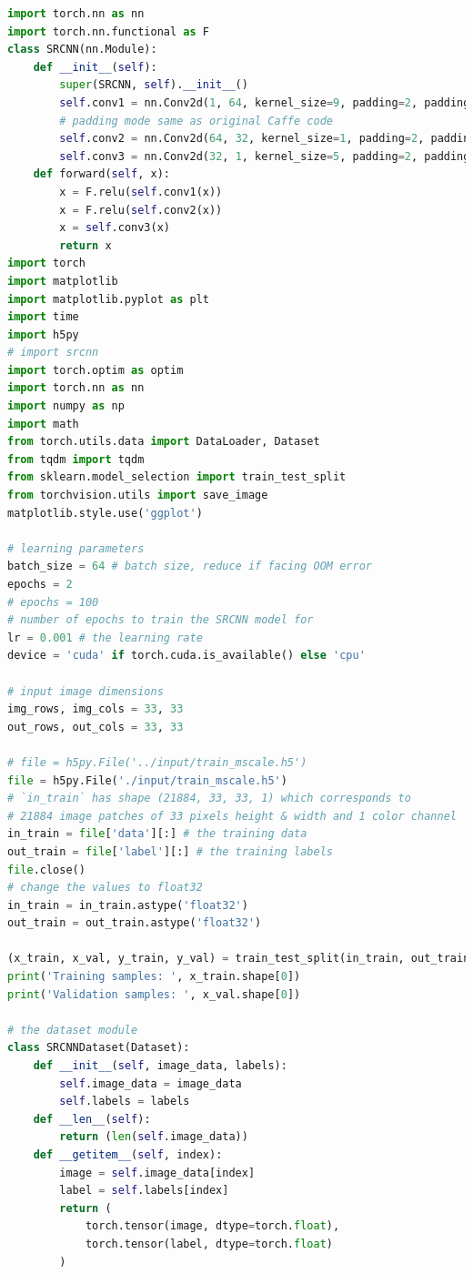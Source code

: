 \documentclass[11pt,UTF8]{ctexart}
\begin{document}
	\begin{lstlisting}[language={python}]
import torch.nn as nn
import torch.nn.functional as F
class SRCNN(nn.Module):
    def __init__(self):
        super(SRCNN, self).__init__()
        self.conv1 = nn.Conv2d(1, 64, kernel_size=9, padding=2, padding_mode='replicate') 
        # padding mode same as original Caffe code
        self.conv2 = nn.Conv2d(64, 32, kernel_size=1, padding=2, padding_mode='replicate')
        self.conv3 = nn.Conv2d(32, 1, kernel_size=5, padding=2, padding_mode='replicate')
    def forward(self, x):
        x = F.relu(self.conv1(x))
        x = F.relu(self.conv2(x))
        x = self.conv3(x)
        return x
import torch
import matplotlib
import matplotlib.pyplot as plt
import time
import h5py
# import srcnn
import torch.optim as optim
import torch.nn as nn
import numpy as np
import math
from torch.utils.data import DataLoader, Dataset
from tqdm import tqdm
from sklearn.model_selection import train_test_split
from torchvision.utils import save_image
matplotlib.style.use('ggplot')

# learning parameters
batch_size = 64 # batch size, reduce if facing OOM error
epochs = 2
# epochs = 100
# number of epochs to train the SRCNN model for
lr = 0.001 # the learning rate
device = 'cuda' if torch.cuda.is_available() else 'cpu'

# input image dimensions
img_rows, img_cols = 33, 33
out_rows, out_cols = 33, 33

# file = h5py.File('../input/train_mscale.h5')
file = h5py.File('./input/train_mscale.h5')
# `in_train` has shape (21884, 33, 33, 1) which corresponds to
# 21884 image patches of 33 pixels height & width and 1 color channel
in_train = file['data'][:] # the training data
out_train = file['label'][:] # the training labels
file.close()
# change the values to float32
in_train = in_train.astype('float32')
out_train = out_train.astype('float32')

(x_train, x_val, y_train, y_val) = train_test_split(in_train, out_train, test_size=0.25)
print('Training samples: ', x_train.shape[0])
print('Validation samples: ', x_val.shape[0])

# the dataset module
class SRCNNDataset(Dataset):
    def __init__(self, image_data, labels):
        self.image_data = image_data
        self.labels = labels
    def __len__(self):
        return (len(self.image_data))
    def __getitem__(self, index):
        image = self.image_data[index]
        label = self.labels[index]
        return (
            torch.tensor(image, dtype=torch.float),
            torch.tensor(label, dtype=torch.float)
        )



\end{lstlisting}
\end{document}
